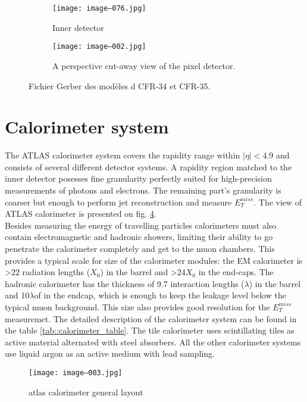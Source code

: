		\begin{figure}[htbp]
			\begin{subfigure}[t]{0.48\textwidth}
				\texttt{[image: image--076.jpg]}
				\caption[Inner detector]{Inner detector}
				\label{fig::id}
			\end{subfigure}
		                \hfill
			\begin{subfigure}[t]{0.48\textwidth}
				\texttt{[image: image--002.jpg]}
				\caption[Pixel detector]{A perspective cut-away view of the pixel detector.}
				\label{fig::pd}
			\end{subfigure}
			\caption{Fichier Gerber des modèles d CFR-34 et CFR-35.}
			\label{fig::cfrs}
		\end{figure}
        \section{Calorimeter system }
		The ATLAS calorimeter system covers the rapidity range within $|\eta| < 4.9$ and consists of several different detector systems. A rapidity region matched to the inner detector posesses fine granularity perfectly suited for high-precision measurements of photons and electrons. The remaining part's granularity is coarser but enough to perform jet reconstruction and measure $E_T^{miss}$. The view of ATLAS calorimeter is presented on fig. \ref{fig::calorimeter_layout}.\\
		Besides measuring the energy of travelling particles calorimeters must also contain electromagnetic and hadronic showers, limiting their ability to go penetrate the calorimeter completely and get to the muon chambers. This provides a typical scale for size of the calorimeter modules: the EM calorimeter\cite{LAr_calo} is >22 radiation lengths ($X_0$) in the barrel and >24$X_0$ in the end-caps. The hadronic calorimeter has the thickness of 9.7 interaction lengths ($\lambda$) in the barrel and 10$\lambda$of in the endcap, which is enough to keep the leakage level below the typical muon background. This size also provides good resolution for the $E_T^{miss}$ measuremet. The detailed description of the calorimeter system can be found in the table \ref{tab::calorimeter_table}.
		The tile calorimeter\cite{Tile_calo} uses scintillating tiles as active material alternated with steel absorbers. All the other calorimeter systems use liquid argon as an active medium with lead sampling.
        \begin{figure}[htpb]
			\texttt{[image: image--003.jpg]}
			\caption{ \gls{atlas} calorimeter general layout}
			\label{fig::calorimeter_layout}
		\end{figure}
